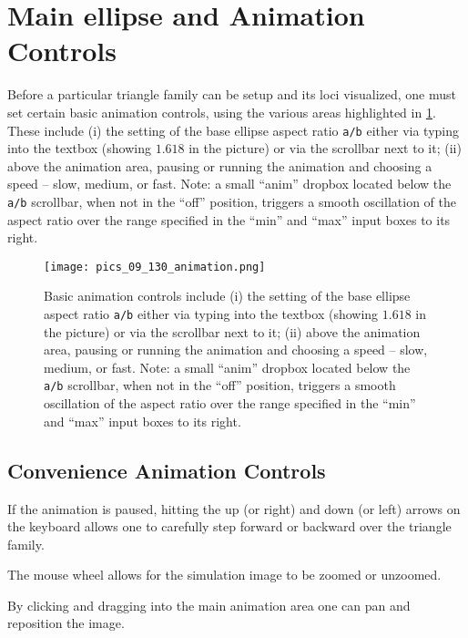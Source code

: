 \section{Main ellipse and Animation Controls}
\label{sec:09-ellipse-anim}

Before a particular triangle family can be setup and its loci visualized, one must set certain basic animation controls, using the various areas highlighted in \cref{fig:09-animation}. These include (i) the setting of the base ellipse aspect ratio \texttt{a/b} either via typing into the textbox (showing $1.618$ in the picture) or via the scrollbar next to it; (ii) above the animation area, pausing or running the animation and choosing a speed -- slow, medium, or fast. Note: a small ``anim'' dropbox located below the \texttt{a/b} scrollbar, when not in the ``off'' position, triggers a smooth oscillation of the aspect ratio over the range specified in the ``min'' and ``max'' input boxes to its right.

\begin{figure}
    \centering
    \texttt{[image: pics\_09\_130\_animation.png]}
    \caption{Basic animation controls include (i) the setting of the base ellipse aspect ratio \texttt{a/b} either via typing into the textbox (showing $1.618$ in the picture) or via the scrollbar next to it; (ii) above the animation area, pausing or running the animation and choosing a speed -- slow, medium, or fast. Note: a small ``anim'' dropbox located below the \texttt{a/b} scrollbar, when not in the ``off'' position, triggers a smooth oscillation of the aspect ratio over the range specified in the ``min'' and ``max'' input boxes to its right.}
    \label{fig:09-animation}
\end{figure}

\subsection{Convenience Animation Controls}

If the animation is paused, hitting the up (or right) and down (or left) arrows on the keyboard allows one to carefully step forward or backward over the triangle family.

The mouse wheel allows for the simulation image to be zoomed or unzoomed.

By clicking and dragging into the main animation area one can pan and reposition the image.